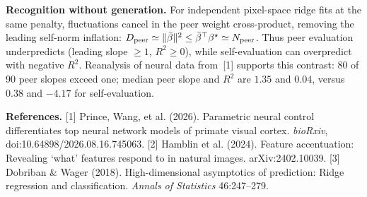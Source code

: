 \documentclass[12pt,a4paper]{article}
\newcommand{\head}[1]{\par\noindent\textbf{#1}\enspace\ignorespaces}
\newcommand{\bt}{\beta^\star}
\newcommand{\mb}{\bar\beta}
\begin{document}
\head{Recognition without generation.}
For independent pixel-space ridge fits at the same penalty, fluctuations cancel in the peer weight cross-product, removing the leading self-norm inflation: $D_{\rm peer}\simeq\|\mb\|^2\le\mb^\top\bt\simeq N_{\rm peer}$. Thus peer evaluation underpredicts (leading slope $\ge1$, $R^2\ge0$), while self-evaluation can overpredict with negative $R^2$. Reanalysis of neural data from~[1] supports this contrast: 80 of 90 peer slopes exceed one; median peer slope and $R^2$ are $1.35$ and $0.04$, versus $0.38$ and $-4.17$ for self-evaluation.

\vspace{2pt}
{\fontsize{10}{11}\selectfont
\textbf{References.}
[1] Prince, Wang, et al. (2026). Parametric neural control differentiates top neural network models of primate visual cortex. \emph{bioRxiv}, doi:10.64898/2026.08.16.745063.
[2] Hamblin et al. (2024). Feature accentuation: Revealing `what' features respond to in natural images. arXiv:2402.10039.
[3] Dobriban \& Wager (2018). High-dimensional asymptotics of prediction: Ridge regression and classification. \emph{Annals of Statistics} 46:247--279.
\par}
\end{document}
